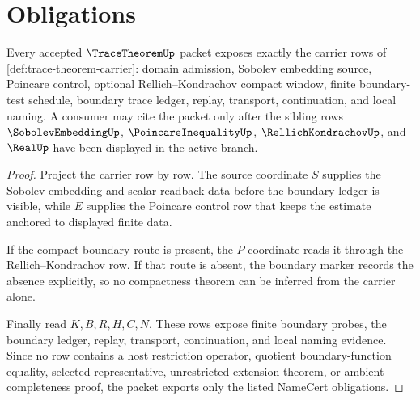 \section{Obligations}
\label{sec:trace-theorem-obligations}

\begin{theorem}
\label{thm:trace-theorem-namecert-obligations}
Every accepted $\TraceTheoremUp$ packet exposes exactly the carrier rows of \autoref{def:trace-theorem-carrier}: domain admission, Sobolev embedding source, Poincare control, optional Rellich--Kondrachov compact window, finite boundary-test schedule, boundary trace ledger, replay, transport, continuation, and local naming. A consumer may cite the packet only after the sibling rows $\SobolevEmbeddingUp$, $\PoincareInequalityUp$, $\RellichKondrachovUp$, and $\RealUp$ have been displayed in the active branch.
\end{theorem}
\begin{proof}
Project the carrier row by row. The source coordinate $S$ supplies the Sobolev embedding and scalar readback data before the boundary ledger is visible, while $E$ supplies the Poincare control row that keeps the estimate anchored to displayed finite data.

If the compact boundary route is present, the $P$ coordinate reads it through the Rellich--Kondrachov row. If that route is absent, the boundary marker records the absence explicitly, so no compactness theorem can be inferred from the carrier alone.

Finally read $K,B,R,H,C,N$. These rows expose finite boundary probes, the boundary ledger, replay, transport, continuation, and local naming evidence. Since no row contains a host restriction operator, quotient boundary-function equality, selected representative, unrestricted extension theorem, or ambient completeness proof, the packet exports only the listed NameCert obligations.
\end{proof}

